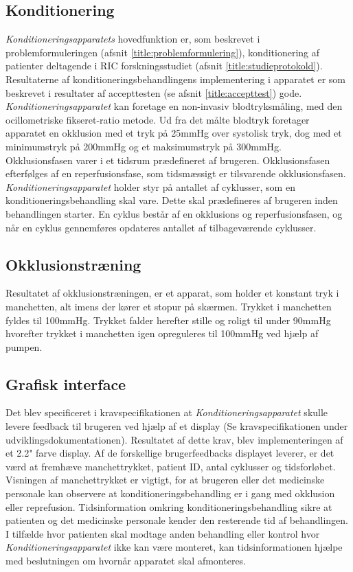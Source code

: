 \subsection{Konditionering}
\textit{Konditioneringsapparatets} hovedfunktion er, som beskrevet i problemformuleringen (afsnit \ref{title:problemformulering}), konditionering af patienter deltagende i RIC forskningsstudiet (afsnit \ref{title:studieprotokold}). Resultaterne af konditioneringsbehandlingens implementering i apparatet er som beskrevet i resultater af accepttesten (se afsnit \ref{title:accepttest}) gode. \textit{Konditioneringsapparatet} kan foretage en non-invasiv blodtryksmåling, med den ocillometriske fikseret-ratio metode. Ud fra det målte blodtryk foretager apparatet en okklusion med et tryk på 25mmHg over systolisk tryk, dog med et minimumstryk på 200mmHg og et maksimumstryk på 300mmHg. Okklusionsfasen varer i et tidsrum prædefineret af brugeren. Okklusionsfasen efterfølges af en reperfusionsfase, som tidsmæssigt er tilsvarende okklusionsfasen. \textit{Konditioneringsapparatet} holder styr på antallet af cyklusser, som en konditioneringsbehandling skal vare. Dette skal prædefineres af brugeren inden behandlingen starter. En cyklus består af en okklusions og reperfusionsfasen, og når en cyklus gennemføres opdateres antallet af tilbageværende cyklusser. 

\subsection{Okklusionstræning}
Resultatet af okklusionstræningen, er et apparat, som holder et konstant tryk i manchetten, alt imens der kører et stopur på skærmen. Trykket i manchetten fyldes til 100mmHg. Trykket falder herefter stille og roligt til under 90mmHg hvorefter trykket i manchetten igen opreguleres til 100mmHg ved hjælp af pumpen. 
 
\subsection{Grafisk interface}
Det blev specificeret i kravspecifikationen at \textit{Konditioneringsapparatet} skulle levere feedback til brugeren ved hjælp af et display (Se kravspecifikationen under udviklingsdokumentationen). Resultatet af dette krav, blev implementeringen af et 2.2" farve display. Af de forskellige brugerfeedbacks displayet leverer, er det værd at fremhæve manchettrykket, patient ID, antal cyklusser og tidsforløbet. Visningen af manchettrykket er vigtigt, for at brugeren eller det medicinske personale kan observere at konditioneringsbehandling er i gang med okklusion eller reprefusion. Tidsinformation omkring konditioneringsbehandling sikre at patienten og det medicinske personale kender den resterende tid af behandlingen. I tilfælde hvor patienten skal modtage anden behandling eller kontrol hvor \textit{Konditioneringsapparatet} ikke kan være monteret, kan tidsinformationen hjælpe med beslutningen om hvornår apparatet skal afmonteres. 

